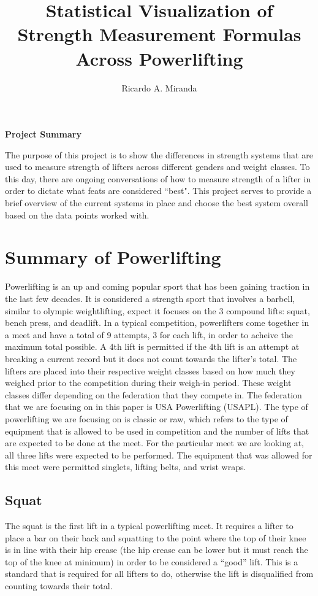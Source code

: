 \documentclass[10pt,letterpaper]{article}
\title{Statistical Visualization of Strength Measurement Formulas Across Powerlifting}
\author{Ricardo A. Miranda}
\begin{document}
    \maketitle
    \begin{center}
        \textbf{Project Summary}
    
    \end{center}
    The purpose of this project is to show the differences in strength systems that are used to measure strength of lifters across different genders and weight classes. To this day, there are ongoing conversations of how to measure strength of a lifter in order to dictate what feats are considered ``best". This project serves to provide a brief overview of the current systems in place and choose the best system overall based on the data points worked with.

    \tableofcontents

    \newpage

    \section{Summary of Powerlifting}
    Powerlifting is an up and coming popular sport that has been gaining traction in the last few decades. It is considered a strength sport that involves a barbell, similar to olympic weightlifting, expect it focuses on the 3 compound lifts: squat, bench press, and deadlift. In a typical competition, powerlifters come together in a meet and have a total of 9 attempts, 3 for each lift, in order to acheive the maximum total possible. A 4th lift is permitted if the 4th lift is an attempt at breaking a current record but it does not count towards the lifter's total. The lifters are placed into their respective weight classes based on how much they weighed prior to the competition during their weigh-in period. These weight classes differ depending on the federation that they compete in. The federation that we are focusing on in this paper is USA Powerlifting (USAPL). The type of powerlifting we are focusing on is classic or raw, which refers to the type of equipment that is allowed to be used in competition and the number of lifts that are expected to be done at the meet. For the particular meet we are looking at, all three lifts were expected to be performed. The equipment that was allowed for this meet were permitted singlets, lifting belts, and wrist wraps.
    \subsection*{Squat}
    The squat is the first lift in a typical powerlifting meet. It requires a lifter to place a bar on their back and squatting to the point where the top of their knee is in line with their hip crease (the hip crease can be lower but it must reach the top of the knee at minimum) in order to be considered a ``good'' lift. This is a standard that is required for all lifters to do, otherwise the lift is disqualified from counting towards their total.
\end{document}
